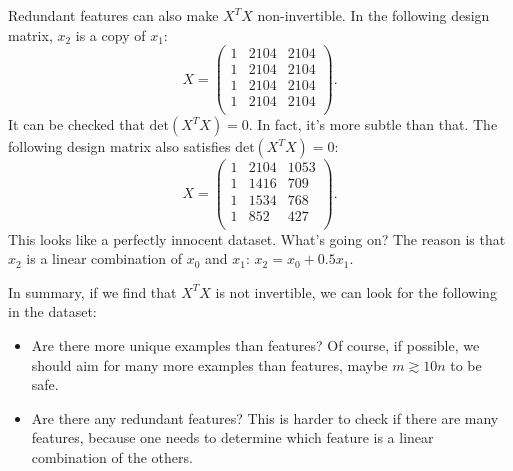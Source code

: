 \documentclass{article}
\theoremstyle{definition}
\begin{document}
Redundant features can also make $X^TX$ non-invertible. In the following design matrix, $x_2$ is a copy of $x_1$:
\begin{equation}
        X =
    \begin{pmatrix}
        1 & 2104 & 2104 \\
        1 & 2104 & 2104 \\
        1 & 2104 & 2104 \\
        1 & 2104 & 2104 \\
    \end{pmatrix}.
\end{equation}
It can be checked that $\text{det}(X^TX)=0$. In fact, it's more subtle than that. The following design matrix also satisfies $\text{det}(X^TX)=0$:
\begin{equation}
        X =
    \begin{pmatrix}
        1 & 2104 & 1053 \\
        1 & 1416 & 709 \\
        1 & 1534 & 768 \\
        1 & 852 & 427 \\
    \end{pmatrix}.
\end{equation}
This looks like a perfectly innocent dataset. What's going on?
The reason is that $x_2$ is a linear combination of $x_0$ and $x_1$: $x_2 = x_0 + 0.5 x_1$.

In summary, if we find that $X^TX$ is not invertible, we can look for the following in the dataset:
\begin{itemize}
    \item Are there more unique examples than features? Of course, if possible, we should aim for many more examples than features, maybe $m\gtrsim 10n$ to be safe.
    \item Are there any redundant features? This is harder to check if there are many features, because one needs to determine which feature is a linear combination of the others.
\end{itemize}


\end{document}

